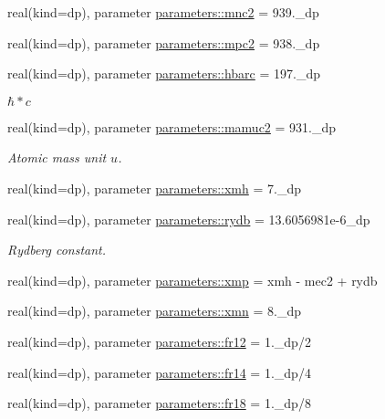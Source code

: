 \begin{DoxyCompactItemize}
real(kind=dp), parameter \mbox{\hyperlink{group__CONSTANTS_ga3cd51d33e13930045ff98294b5044e2c}{parameters\+::mnc2}} = 939.\+\_\+dp
\item 
real(kind=dp), parameter \mbox{\hyperlink{group__CONSTANTS_ga2e354d662a28a3a09a9819c54f818dab}{parameters\+::mpc2}} = 938.\+\_\+dp
\item 
real(kind=dp), parameter \mbox{\hyperlink{group__CONSTANTS_gafb47622609b676d956b2c58f4b909064}{parameters\+::hbarc}} = 197.\+\_\+dp
\begin{DoxyCompactList}\small\item\em $\hbar*c$ \end{DoxyCompactList}\item 
real(kind=dp), parameter \mbox{\hyperlink{group__HBAR2__2M_gaa00326a999bcae07e22d89387404ac19}{parameters\+::mamuc2}} = 931.\+\_\+dp
\begin{DoxyCompactList}\small\item\em Atomic mass unit $u$. \end{DoxyCompactList}\item 
real(kind=dp), parameter \mbox{\hyperlink{group__HBAR2__2M_gaad7518fe64b61c89a5fdca4244b22af1}{parameters\+::xmh}} = 7.\+\_\+dp
\item 
real(kind=dp), parameter \mbox{\hyperlink{group__HBAR2__2M_ga1ee1de4838adf9dd601aa5c6d518709c}{parameters\+::rydb}} = 13.\+6056981e-\/6\+\_\+dp
\begin{DoxyCompactList}\small\item\em Rydberg constant. \end{DoxyCompactList}\item 
real(kind=dp), parameter \mbox{\hyperlink{group__HBAR2__2M_gaca637757baec6d59dc2b73dcf21b6b3d}{parameters\+::xmp}} = xmh -\/ mec2 + rydb
\item 
real(kind=dp), parameter \mbox{\hyperlink{group__HBAR2__2M_ga54928a3b468a11418226e44d5f2337ce}{parameters\+::xmn}} = 8.\+\_\+dp
\item 
real(kind=dp), parameter \mbox{\hyperlink{group__FRACTIONS_ga22877764fb6363b2fa930793c57a03da}{parameters\+::fr12}} = 1.\+\_\+dp/2
\item 
real(kind=dp), parameter \mbox{\hyperlink{group__FRACTIONS_gaffec0a7933c65703944576ebea0c1cd1}{parameters\+::fr14}} = 1.\+\_\+dp/4
\item 
real(kind=dp), parameter \mbox{\hyperlink{group__FRACTIONS_ga59c72e10a23b892113d106b25c1f60d7}{parameters\+::fr18}} = 1.\+\_\+dp/8
\item 

\end{DoxyCompactItemize}

